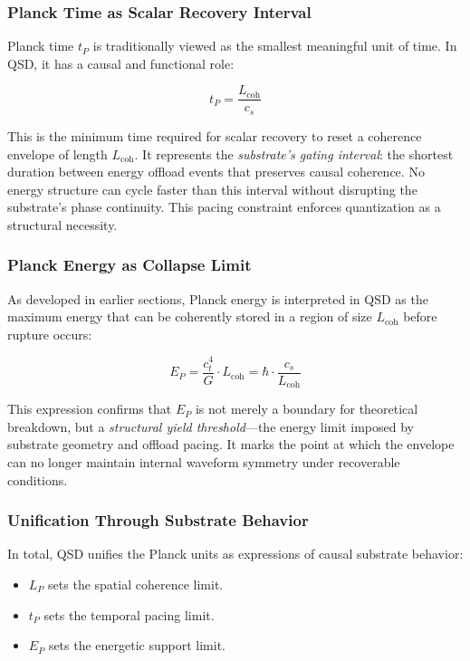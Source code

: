 \documentclass[entropy,article,submit,pdftex,moreauthors]{Definitions/mdpi}
\begin{document}
\subsubsection{Planck Time as Scalar Recovery Interval}

Planck time $t_P$ is traditionally viewed as the smallest meaningful unit of time. In QSD, it has a causal and functional role:

\begin{equation}
t_P = \frac{L_{\text{coh}}}{c_s}
\end{equation}

This is the minimum time required for scalar recovery to reset a coherence envelope of length $L_{\text{coh}}$. It represents the \textit{substrate's gating interval}: the shortest duration between energy offload events that preserves causal coherence. No energy structure can cycle faster than this interval without disrupting the substrate’s phase continuity. This pacing constraint enforces quantization as a structural necessity.

\subsubsection{Planck Energy as Collapse Limit}

As developed in earlier sections, Planck energy is interpreted in QSD as the maximum energy that can be coherently stored in a region of size $L_{\text{coh}}$ before rupture occurs:

\begin{equation}
E_P = \frac{c_t^4}{G} \cdot L_{\text{coh}} = \hbar \cdot \frac{c_s}{L_{\text{coh}}}
\end{equation}

This expression confirms that $E_P$ is not merely a boundary for theoretical breakdown, but a \textit{structural yield threshold}---the energy limit imposed by substrate geometry and offload pacing. It marks the point at which the envelope can no longer maintain internal waveform symmetry under recoverable conditions.

\subsubsection{Unification Through Substrate Behavior}

In total, QSD unifies the Planck units as expressions of causal substrate behavior:
\begin{itemize}
  \item $L_P$ sets the spatial coherence limit.
  \item $t_P$ sets the temporal pacing limit.
  \item $E_P$ sets the energetic support limit.
\end{itemize}
\end{document}
